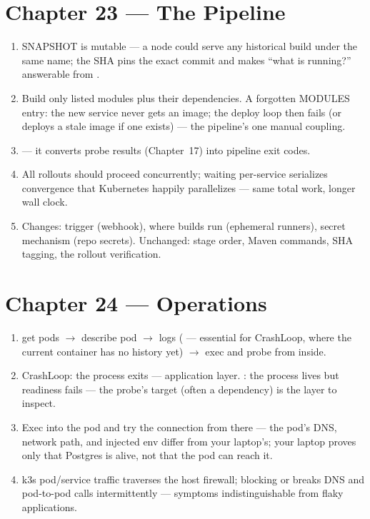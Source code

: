 \section*{Chapter 23 --- The Pipeline}
\begin{enumerate}
  \item SNAPSHOT is mutable --- a node could serve any historical
  build under the same name; the SHA pins the exact commit and makes
  ``what is running?'' answerable from .
  \item Build only listed modules plus their dependencies. A
  forgotten MODULES entry: the new service never gets an image; the
  deploy loop then fails (or deploys a stale image if one exists) ---
  the pipeline's one manual coupling.
  \item {} --- it converts
  probe results (Chapter~17) into pipeline exit codes.
  \item All rollouts should proceed concurrently; waiting per-service
  serializes convergence that Kubernetes happily parallelizes ---
  same total work, longer wall clock.
  \item Changes: trigger (webhook), where builds run (ephemeral
  runners), secret mechanism (repo secrets). Unchanged: stage order,
  Maven commands, SHA tagging, the rollout verification.
\end{enumerate}

\section*{Chapter 24 --- Operations}
\begin{enumerate}
  \item get pods $\rightarrow$ describe pod $\rightarrow$ logs
  ( --- essential for CrashLoop, where the current
  container has no history yet) $\rightarrow$ exec and probe from
  inside.
  \item CrashLoop: the process exits --- application layer.
  : the process lives but readiness fails ---
  the probe's target (often a dependency) is the layer to inspect.
  \item Exec into the pod and try the connection from there --- the
  pod's DNS, network path, and injected env differ from your
  laptop's; your laptop proves only that Postgres is alive, not that
  the pod can reach it.
  \item k3s pod/service traffic traverses the host firewall;
  blocking  or  breaks DNS and
  pod-to-pod calls intermittently --- symptoms indistinguishable from
  flaky applications.
\end{enumerate}

